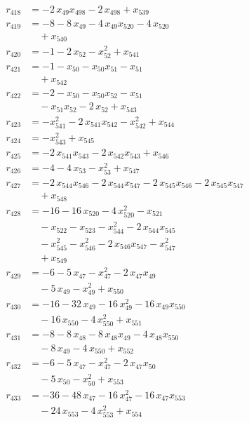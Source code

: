 \begin{align*}
r_{418} &= -2\,x_{49} x_{498} - 2\,x_{498} + x_{539} \\
r_{419} &= -8 - 8\,x_{49} - 4\,x_{49} x_{520} - 4\,x_{520} \\
&\quad{}+ x_{540} \\
r_{420} &= -1 - 2\,x_{52} - x_{52}^{2} + x_{541} \\
r_{421} &= -1 - x_{50} - x_{50} x_{51} - x_{51} \\
&\quad{}+ x_{542} \\
r_{422} &= -2 - x_{50} - x_{50} x_{52} - x_{51} \\
&\quad{}- x_{51} x_{52} - 2\,x_{52} + x_{543} \\
r_{423} &= -x_{541}^{2} - 2\,x_{541} x_{542} - x_{542}^{2} + x_{544} \\
r_{424} &= -x_{543}^{2} + x_{545} \\
r_{425} &= -2\,x_{541} x_{543} - 2\,x_{542} x_{543} + x_{546} \\
r_{426} &= -4 - 4\,x_{53} - x_{53}^{2} + x_{547} \\
r_{427} &= -2\,x_{544} x_{546} - 2\,x_{544} x_{547} - 2\,x_{545} x_{546} - 2\,x_{545} x_{547} \\
&\quad{}+ x_{548} \\
r_{428} &= -16 - 16\,x_{520} - 4\,x_{520}^{2} - x_{521} \\
&\quad{}- x_{522} - x_{523} - x_{544}^{2} - 2\,x_{544} x_{545} \\
&\quad{}- x_{545}^{2} - x_{546}^{2} - 2\,x_{546} x_{547} - x_{547}^{2} \\
&\quad{}+ x_{549} \\
r_{429} &= -6 - 5\,x_{47} - x_{47}^{2} - 2\,x_{47} x_{49} \\
&\quad{}- 5\,x_{49} - x_{49}^{2} + x_{550} \\
r_{430} &= -16 - 32\,x_{49} - 16\,x_{49}^{2} - 16\,x_{49} x_{550} \\
&\quad{}- 16\,x_{550} - 4\,x_{550}^{2} + x_{551} \\
r_{431} &= -8 - 8\,x_{48} - 8\,x_{48} x_{49} - 4\,x_{48} x_{550} \\
&\quad{}- 8\,x_{49} - 4\,x_{550} + x_{552} \\
r_{432} &= -6 - 5\,x_{47} - x_{47}^{2} - 2\,x_{47} x_{50} \\
&\quad{}- 5\,x_{50} - x_{50}^{2} + x_{553} \\
r_{433} &= -36 - 48\,x_{47} - 16\,x_{47}^{2} - 16\,x_{47} x_{553} \\
&\quad{}- 24\,x_{553} - 4\,x_{553}^{2} + x_{554} \\

\end{align*}
